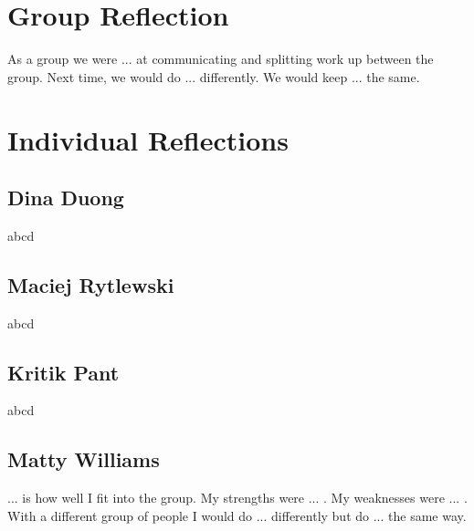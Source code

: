 \documentclass[11pt]{article}
\begin{document}
\section{Group Reflection}

As a group we were ... at communicating and splitting work up between the group.
Next time, we would do ... differently. We would keep ... the same.

\section{Individual Reflections}

\subsection{Dina Duong}

abcd

\subsection{Maciej Rytlewski}

abcd

\subsection{Kritik Pant}

abcd

\subsection{Matty Williams}

... is how well I fit into the group.
My strengths were ... .
My weaknesses were ... .
With a different group of people I would do ... differently but do ... the same way. 
\end{document}
